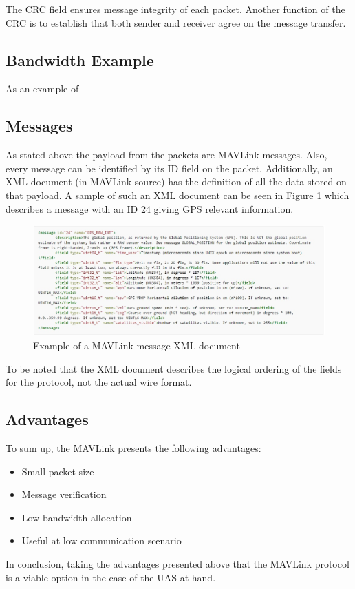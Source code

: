 The CRC field ensures message integrity of each packet. Another function of the CRC is to establish that both sender and receiver agree on the message transfer.

\subsection{Bandwidth Example}
As an example of 

\subsection{Messages}
As stated above the payload from the packets are MAVLink messages. Also, every message can be identified by its ID field on the packet. Additionally, an XML document (in MAVLink source) has the definition of all the data stored on that payload. A sample of such an XML document can be seen in Figure \ref{fig:mav_msg} which describes a message with an ID 24 giving GPS relevant information.

\begin{figure}[H]
	\centering
	\includegraphics[scale=0.5]{figures/mavlink_msg.jpg}
	\caption{Example of a MAVLink message XML document}
	\label{fig:mav_msg}
\end{figure}

To be noted that the XML document describes the logical ordering of the fields for the protocol, not the actual wire format.

\subsection{Advantages}
To sum up, the MAVLink presents the following advantages:
\begin{itemize}
	\item Small packet size
	\item Message verification
	\item Low bandwidth allocation
	\item Useful at low communication scenario
\end{itemize}

In conclusion, taking the advantages presented above that the MAVLink protocol is a viable option in the case of the UAS at hand.
